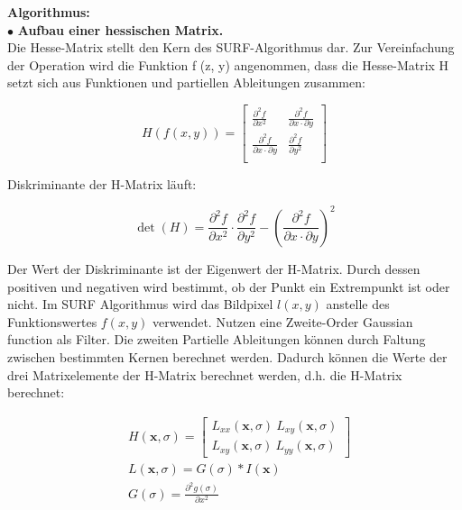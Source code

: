 \textbf{Algorithmus:}\\
$\bullet$ \textbf{Aufbau einer hessischen Matrix.}\\
Die Hesse-Matrix stellt den Kern des SURF-Algorithmus dar. Zur Vereinfachung der Operation wird die Funktion f (z, y) angenommen, dass die Hesse-Matrix H setzt sich aus Funktionen und partiellen Ableitungen zusammen:

\begin{equation}
   H(f(x,y)) = \begin{bmatrix}
   \frac{\partial^{2}f}{\partial x^{2}} & \frac{\partial^{2}f}{\partial x \cdot \partial y} \\
   \frac{\partial^{2}f}{\partial x \cdot \partial y} & \frac{\partial^{2}f}{\partial y^{2}} \\   
   \end{bmatrix}
\end{equation}

 Diskriminante der H-Matrix läuft:
 
\begin{equation}
   \det(H) = \frac{\partial^{2}f}{\partial x^{2}} \cdot \frac{\partial^{2}f}{\partial y^{2}} - (\frac{\partial^{2}f}{\partial x \cdot \partial y})^2  
\end{equation}

Der Wert der Diskriminante ist der Eigenwert der H-Matrix. Durch dessen positiven und negativen wird bestimmt, ob der Punkt ein Extrempunkt ist oder nicht. Im SURF Algorithmus wird das Bildpixel $l(x,y)$ anstelle des Funktionswertes $f(x,y)$ verwendet. Nutzen eine Zweite-Order Gaussian function als Filter. Die zweiten Partielle Ableitungen können durch Faltung zwischen bestimmten Kernen berechnet werden. Dadurch können die Werte der drei Matrixelemente der H-Matrix berechnet werden, d.h. die H-Matrix berechnet:

\begin{equation}
\begin{split}
   &H(\textbf{x},\sigma) = \begin{bmatrix}
   L_{xx}(\textbf{x},\sigma)\ L_{xy}(\textbf{x},\sigma) \\
   L_{xy}(\textbf{x},\sigma)\ L_{yy}(\textbf{x},\sigma)
   \end{bmatrix} \\   
   &L(\textbf{x},\sigma) = G(\sigma)*I(\textbf{x}) \\  
   &G(\sigma) = \frac{\partial^{2}g(\sigma)}{\partial x^{2}}      
\end{split}
\end{equation}


